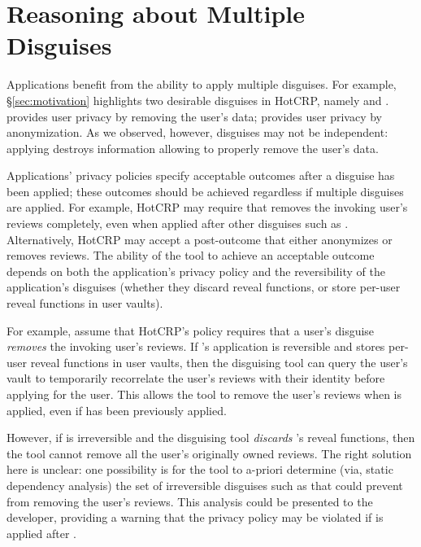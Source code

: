 \section{Reasoning about Multiple Disguises}
\label{sec:composition}

Applications benefit from the ability to apply multiple disguises. For example,
\S\ref{sec:motivation} highlights two desirable disguises in HotCRP, namely \gdpr and \ca. \gdpr
provides user privacy by removing the user's data; \ca provides user privacy by anonymization.  As
we observed, however, disguises may not be independent: applying \ca destroys information allowing
\gdpr to properly remove the user's data.

Applications' privacy policies specify acceptable outcomes after a disguise has been
applied; these outcomes should be achieved regardless if multiple disguises are applied.
For example, HotCRP may require that \gdpr removes the invoking user's reviews completely, even when
applied after other disguises such as \ca.  Alternatively, HotCRP may accept a post-\gdpr outcome that either
anonymizes or removes reviews. 
The ability of the tool to achieve an acceptable outcome depends on both the application's privacy
policy and the reversibility of the application's disguises (\ie whether they discard reveal functions, or store
per-user reveal functions in user vaults).

For example, assume that HotCRP's policy requires that a user's \gdpr disguise \emph{removes} the
invoking user's reviews. If \ca's application is reversible and stores per-user reveal functions in
user vaults, then the disguising tool can query the user's vault to temporarily recorrelate the
user's reviews with their identity before applying \gdpr for the user. This allows the tool to
remove the user's reviews when \gdpr is applied, even if \ca has been previously applied.
%

However, if \ca is irreversible and the disguising tool \emph{discards} \ca's reveal functions, then
the tool cannot remove all the user's originally owned reviews.  The right solution here is unclear:
one possibility is for the tool to a-priori determine (via, \eg static dependency analysis) the set
of irreversible disguises such as \ca that could prevent \gdpr from removing the user's reviews.
This analysis could be presented to the developer, providing a warning that the privacy policy may
be violated if \gdpr is applied after \ca.

